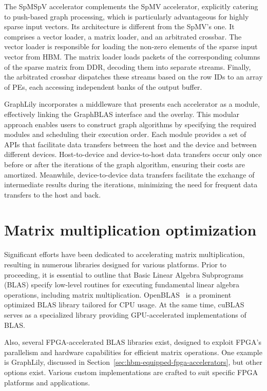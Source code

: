The SpMSpV accelerator complements the SpMV accelerator, explicitly catering to push-based graph processing, which is particularly advantageous for highly sparse input vectors.
Its architecture is different from the SpMV's one.
It comprises a vector loader, a matrix loader, and an arbitrated crossbar.
The vector loader is responsible for loading the non-zero elements of the sparse input vector from HBM. The matrix loader loads packets of the corresponding columns of the sparse matrix from DDR, decoding them into separate streams.
Finally, the arbitrated crossbar dispatches these streams based on the row IDs to an array of PEs, each accessing independent banks of the output buffer.

GraphLily incorporates a middleware that presents each accelerator as a module, effectively linking the GraphBLAS interface and the overlay.
This modular approach enables users to construct graph algorithms by specifying the required modules and scheduling their execution order.
Each module provides a set of APIs that facilitate data transfers between the host and the device and between different devices.
Host-to-device and device-to-host data transfers occur only once before or after the iterations of the graph algorithm, ensuring their costs are amortized.
Meanwhile, device-to-device data transfers facilitate the exchange of intermediate results during the iterations, minimizing the need for frequent data transfers to the host and back.

\section{Matrix multiplication optimization}
\label{sec:matmul-optimization}%

Significant efforts have been dedicated to accelerating matrix multiplication, resulting in numerous libraries designed for various platforms.
Prior to proceeding, it is essential to outline that Basic Linear Algebra Subprograms (BLAS) specify low-level routines for executing fundamental linear algebra operations, including matrix multiplication.
OpenBLAS~\cite{openblas} is a prominent optimized BLAS library tailored for CPU usage.
At the same time, cuBLAS~\cite{cublas} serves as a specialized library providing GPU-accelerated implementations of BLAS\@.

Also, several FPGA-accelerated BLAS libraries exist, designed to exploit FPGA's parallelism and hardware capabilities for efficient matrix operations.
One example is GraphLily, discussed in Section~\ref{sec:hbm-equipped-fpga-accelerators}, but other options exist.
Various custom implementations are crafted to suit specific FPGA platforms and applications.

